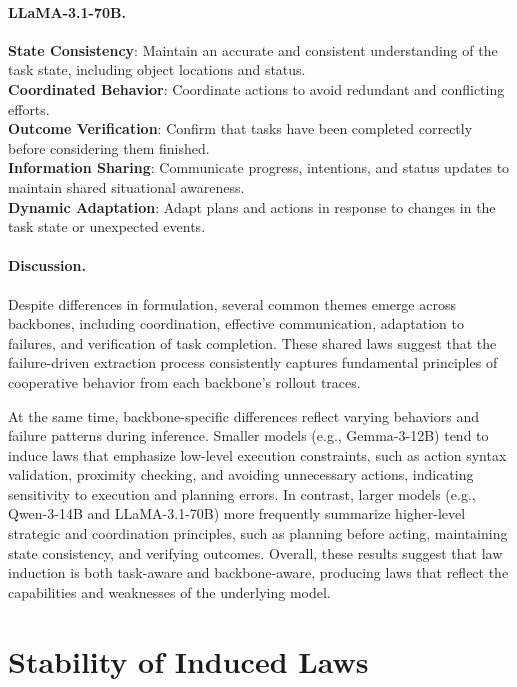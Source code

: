 \documentclass{article}
\theoremstyle{plain}
\theoremstyle{definition}
\theoremstyle{remark}
\begin{document}
\paragraph{LLaMA-3.1-70B.}
\begin{mdframed}[linewidth=0.8pt, roundcorner=4pt, innerleftmargin=6pt, innerrightmargin=6pt]
\textbf{State Consistency}: Maintain an accurate and consistent understanding of the task state, including object locations and status. \\
\textbf{Coordinated Behavior}: Coordinate actions to avoid redundant and conflicting efforts. \\
\textbf{Outcome Verification}: Confirm that tasks have been completed correctly before considering them finished. \\
\textbf{Information Sharing}: Communicate progress, intentions, and status updates to maintain shared situational awareness. \\
\textbf{Dynamic Adaptation}: Adapt plans and actions in response to changes in the task state or unexpected events.
\end{mdframed}

\paragraph{Discussion.}
Despite differences in formulation, several common themes emerge across backbones, including coordination, effective communication, adaptation to failures, and verification of task completion. These shared laws suggest that the failure-driven extraction process consistently captures fundamental principles of cooperative behavior from each backbone's rollout traces.

At the same time, backbone-specific differences reflect varying behaviors and failure patterns during inference. Smaller models (e.g., Gemma-3-12B) tend to induce laws that emphasize low-level execution constraints, such as action syntax validation, proximity checking, and avoiding unnecessary actions, indicating sensitivity to execution and planning errors. In contrast, larger models (e.g., Qwen-3-14B and LLaMA-3.1-70B) more frequently summarize higher-level strategic and coordination principles, such as planning before acting, maintaining state consistency, and verifying outcomes. Overall, these results suggest that law induction is both task-aware and backbone-aware, producing laws that reflect the capabilities and weaknesses of the underlying model.

\section{Stability of Induced Laws}
\label{sec:appendix-stability}
\end{document}
